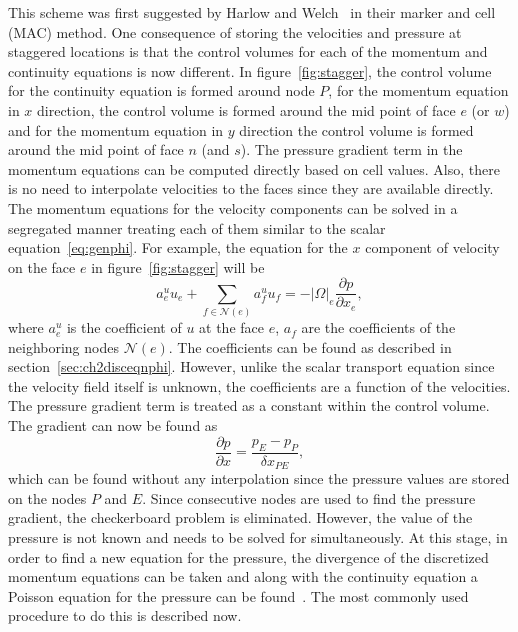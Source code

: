 This scheme was first suggested by Harlow and Welch~\cite{F.H.Harlow1965} in their marker and cell (MAC) method. One consequence of storing the velocities and pressure at staggered locations is that the control volumes for each of the momentum and continuity equations is now different. In figure~\ref{fig:stagger}, the control volume for the continuity equation is formed around node $P$, for the momentum equation in $x$ direction, the control volume is formed around the mid point of face $e$ (or $w$) and for the momentum equation in $y$ direction the control volume is formed around the mid point of face $n$ (and $s$).
The pressure gradient term in the momentum equations can be computed directly based on cell values. Also, there is no need to interpolate velocities to the faces since they are available directly. The momentum equations for the velocity components can be solved in a segregated manner treating each of them similar to the scalar equation~\ref{eq:genphi}. For example, the equation for the $x$ component of velocity on the face $e$ in figure~\ref{fig:stagger} will be
\begin{equation}
a_e^u u_e + \sum_{f \in\mathcal{N}(e)} a_f^u u_f = -|\Omega|_e \frac{\partial p}{\partial x_e},
\label{eq:segueqn}
\end{equation}
where $a_e^u$ is the coefficient of $u$ at the face $e$, $a_f$ are the coefficients of the neighboring nodes $\mathcal{N}(e)$. The coefficients can be found as described in section~\ref{sec:ch2disceqnphi}. However, unlike the scalar transport equation since the velocity field itself is unknown, the coefficients are a function of the velocities. The pressure gradient term is treated as a constant within the control volume. The gradient can now be found as 
\begin{equation}
\frac{\partial p}{\partial x} = \frac{p_E - p_P}{\delta x_{PE}},
\end{equation}
which can be found without any interpolation since the pressure values are stored on the nodes $P$ and $E$. Since consecutive nodes are used to find the pressure gradient, the checkerboard problem is eliminated. However, the value of the pressure is not known and needs to be solved for simultaneously. At this stage, in order to find a new equation for the pressure, the divergence of the discretized momentum equations can be taken and along with the continuity equation a Poisson equation for the pressure can be found~\cite{Ferziger2002}. The most commonly used procedure to do this is described now.

